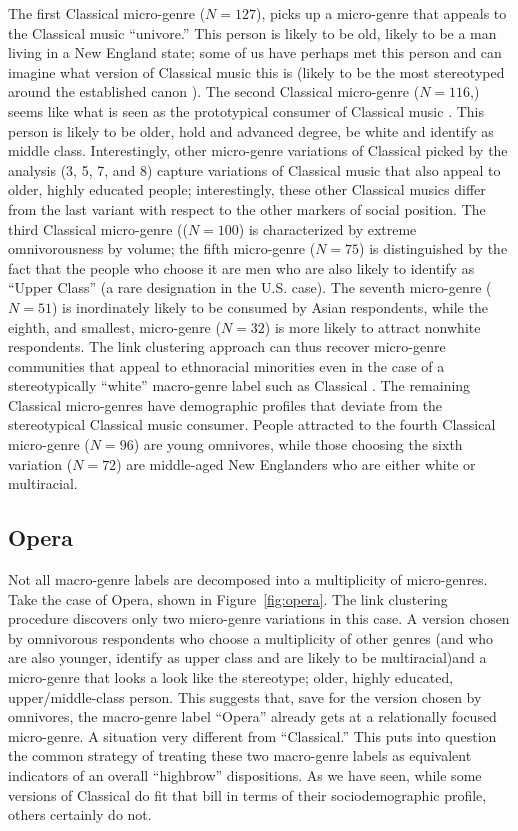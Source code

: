 The first Classical micro-genre ($N=127$), picks up a micro-genre that appeals to the Classical music ``univore.'' This person is likely to be old, likely to be a man living in a New England state; some of us have perhaps met this person and can imagine what version of Classical music this is (likely to be the most stereotyped around the established canon \citep{kremp10}). The second Classical micro-genre ($N = 116$,) seems like what is seen as the prototypical consumer of Classical music \citep{lizardo_skiles16}. This person is likely to be older, hold and advanced degree, be white and identify as middle class. Interestingly, other micro-genre variations of Classical picked by the analysis (3, 5, 7, and 8) capture variations of Classical music that also appeal to older, highly educated people; interestingly, these other Classical musics differ from the last variant with respect to the other markers of social position. The third Classical micro-genre (($N = 100$) is characterized by extreme omnivorousness by volume; the fifth micro-genre ($N = 75$) is distinguished by the fact that the people who choose it are men who are also likely to identify as ``Upper Class'' (a rare designation in the U.S. case). The seventh micro-genre ($N = 51$) is inordinately likely to be consumed by Asian respondents, while the eighth, and smallest, micro-genre ($N = 32$) is more likely to attract nonwhite respondents. The link clustering approach can thus recover micro-genre communities that appeal to ethnoracial minorities even in the case of a stereotypically ``white'' macro-genre label such as Classical \citep{lizardo_skiles16}. The remaining Classical micro-genres have demographic profiles that deviate from the stereotypical Classical music consumer. People attracted to the fourth Classical micro-genre ($N = 96$) are young omnivores, while those choosing the sixth variation ($N = 72$) are middle-aged New Englanders who are either white or multiracial. 

\subsection{Opera}

Not all macro-genre labels are decomposed into a multiplicity of micro-genres. Take the case of Opera, shown in Figure~\ref{fig:opera}. The link clustering procedure discovers only two micro-genre variations in this case. A version chosen by omnivorous respondents who choose a multiplicity of other genres (and who are also younger, identify as upper class and are likely to be multiracial)and a micro-genre that looks a look like the stereotype; older, highly educated, upper/middle-class person. This suggests that, save for the version chosen by omnivores, the macro-genre label ``Opera'' already gets at a relationally focused micro-genre. A situation very different from ``Classical.'' This puts into question the common strategy of treating these two macro-genre labels as equivalent indicators of an overall ``highbrow'' dispositions. As we have seen, while some versions of Classical do fit that bill in terms of their sociodemographic profile, others certainly do not. 

